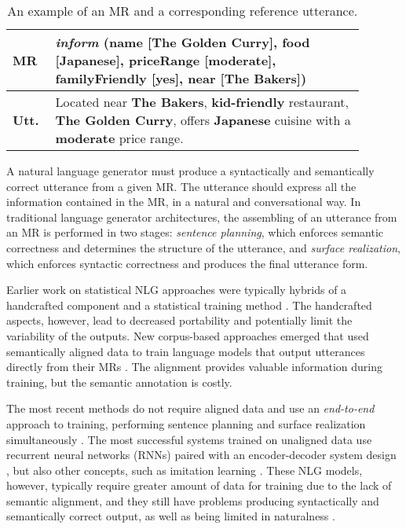 \documentclass[11pt,a4paper]{article}
\begin{document}
\begin{table}
    \small
   	\centering
    \begin{tabular}{>{\centering\arraybackslash} m{0.1\linewidth} m{0.79\linewidth}}
    	\toprule
    	\textbf{MR} & \emph{inform} (name [\textbf{The Golden Curry}], food [\textbf{Japanese}], priceRange [\textbf{moderate}], familyFriendly [\textbf{yes}], near [\textbf{The Bakers}]) \\
        \midrule
    	\textbf{Utt.} & Located near \textbf{The Bakers}, \textbf{kid-friendly} restaurant, \textbf{The Golden Curry}, offers \textbf{Japanese} cuisine with a \textbf{moderate} price range. \\
        \bottomrule
    \end{tabular}
 	\vspace{-0.3cm}
	\caption{An example of an MR and a corresponding reference utterance.}
    \label{table:mr_utterance_example}
 	\vspace{-0.3cm}
\end{table}



A natural language generator must produce a syntactically and semantically correct utterance from a given MR. The utterance should express all the information contained in the MR, in a natural and conversational way. In traditional language generator architectures, the assembling of an utterance from an MR is performed in two stages: \emph{sentence planning}, which enforces semantic correctness and determines the structure of the utterance, and \emph{surface realization}, which enforces syntactic correctness and produces the final utterance form.

Earlier work on statistical NLG approaches were typically hybrids of a handcrafted component and a statistical training method \cite{langkilde1998generation, stent2004trainable, rieser2010natural}.
The handcrafted aspects, however, lead to decreased portability and potentially limit the variability of the outputs. New corpus-based approaches emerged that used semantically aligned data to train language models that output utterances directly from their MRs \cite{mairesse2010phrase, mairesse2014stochastic}. The alignment provides valuable information during training, but the semantic annotation is costly.

The most recent methods do not require aligned data and use an \emph{end-to-end} approach to training, performing sentence planning and surface realization simultaneously \cite{konstas2013global}. The most successful systems trained on unaligned data use recurrent neural networks (RNNs) paired with an encoder-decoder system design \cite{mei2015talk, duvsek2016sequence}, but also other concepts, such as imitation learning \cite{lampouras2016imitation}. These NLG models, however, typically require greater amount of data for training due to the lack of semantic alignment, and they still have problems producing syntactically and semantically correct output, as well as being limited in naturalness \cite{nayak2017plan}.
\end{document}
